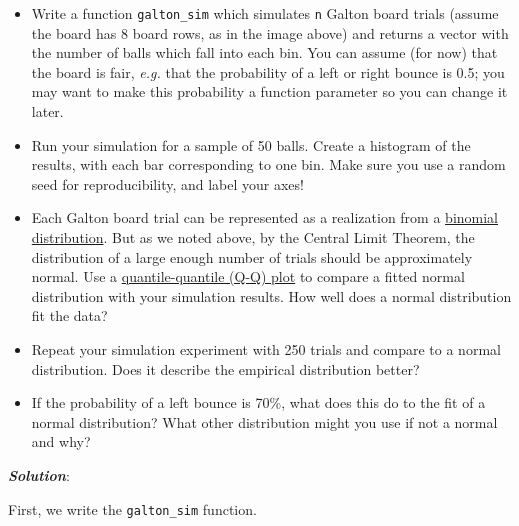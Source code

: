 \documentclass[
  letterpaper,
  DIV=11,
  numbers=noendperiod]{scrartcl}
\providecommand{\tightlist}{%
  \setlength{\itemsep}{0pt}\setlength{\parskip}{0pt}}\usepackage{longtable,booktabs,array}
\begin{document}
\begin{itemize}
\tightlist
\item
  Write a function \texttt{galton\_sim} which simulates \texttt{n}
  Galton board trials (assume the board has 8 board rows, as in the
  image above) and returns a vector with the number of balls which fall
  into each bin. You can assume (for now) that the board is fair,
  \emph{e.g.} that the probability of a left or right bounce is 0.5; you
  may want to make this probability a function parameter so you can
  change it later.
\item
  Run your simulation for a sample of 50 balls. Create a histogram of
  the results, with each bar corresponding to one bin. Make sure you use
  a random seed for reproducibility, and label your axes!
\item
  Each Galton board trial can be represented as a realization from a
  \href{https://en.wikipedia.org/wiki/Binomial_distribution}{binomial
  distribution}. But as we noted above, by the Central Limit Theorem,
  the distribution of a large enough number of trials should be
  approximately normal. Use a
  \href{https://en.wikipedia.org/wiki/Q\%E2\%80\%93Q_plot}{quantile-quantile
  (Q-Q) plot} to compare a fitted normal distribution with your
  simulation results. How well does a normal distribution fit the data?
\item
  Repeat your simulation experiment with 250 trials and compare to a
  normal distribution. Does it describe the empirical distribution
  better?
\item
  If the probability of a left bounce is 70\%, what does this do to the
  fit of a normal distribution? What other distribution might you use if
  not a normal and why?
\end{itemize}

\textbf{\emph{Solution}}:

First, we write the \texttt{galton\_sim} function.
\end{document}
